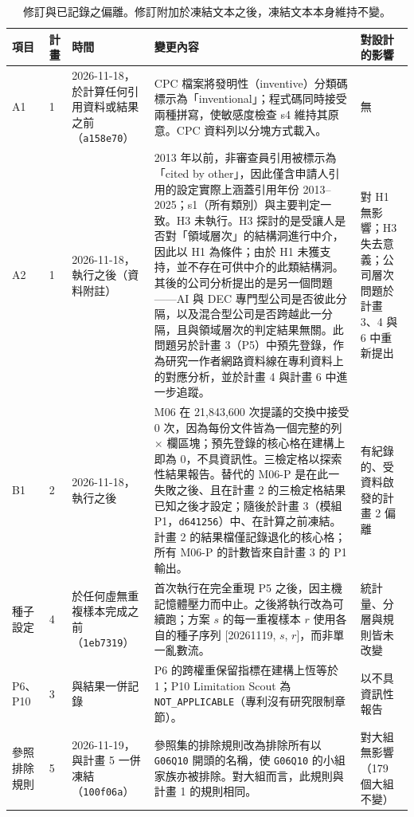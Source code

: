 \begin{table}[tbp]
\centering
\caption{修訂與已記錄之偏離。修訂附加於凍結文本之後，凍結文本本身維持不變。}
\label{zh:tab:app_amend}
\footnotesize
\setlength{\tabcolsep}{4pt}
\begin{tabular}{p{1.3cm}p{1.2cm}p{2.6cm}p{6.4cm}p{3.1cm}}
\toprule
項目 & 計畫 & 時間 & 變更內容 & 對設計的影響 \tabularnewline
\midrule
\raggedright A1 & \raggedright 1 & \raggedright 2026-11-18，於計算任何引用資料或結果之前（\texttt{a158e70}） & \raggedright CPC 檔案將發明性（inventive）分類碼標示為「inventional」；程式碼同時接受兩種拼寫，使敏感度檢查 s4 維持其原意。CPC 資料列以分塊方式載入。 & \raggedright 無 \tabularnewline
\addlinespace
\raggedright A2 & \raggedright 1 & \raggedright 2026-11-18，執行之後（資料附註） & \raggedright 2013 年以前，非審查員引用被標示為「cited by other」，因此僅含申請人引用的設定實際上涵蓋引用年份 2013--2025；s1（所有類別）與主要判定一致。H3 未執行。H3 探討的是受讓人是否對「領域層次」的結構洞進行中介，因此以 H1 為條件；由於 H1 未獲支持，並不存在可供中介的此類結構洞。其後的公司分析提出的是另一個問題——AI 與 DEC 專門型公司是否彼此分隔，以及混合型公司是否跨越此一分隔，且與領域層次的判定結果無關。此問題另於計畫 3（P5）中預先登錄，作為研究一作者網路資料線在專利資料上的對應分析，並於計畫 4 與計畫 6 中進一步追蹤。 & \raggedright 對 H1 無影響；H3 失去意義；公司層次問題於計畫 3、4 與 6 中重新提出 \tabularnewline
\addlinespace
\raggedright B1 & \raggedright 2 & \raggedright 2026-11-18，執行之後 & \raggedright M06 在 21,843,600 次提議的交換中接受 0 次，因為每份文件皆為一個完整的列 $\times$ 欄區塊；預先登錄的核心格在建構上即為 0，不具資訊性。三檢定格以探索性結果報告。替代的 M06-P 是在此一失敗之後、且在計畫 2 的三檢定格結果已知之後才設定；隨後於計畫 3（模組 P1，\texttt{d641256}）中、在計算之前凍結。計畫 2 的結果檔僅記錄退化的核心格；所有 M06-P 的計數皆來自計畫 3 的 P1 輸出。 & \raggedright 有紀錄的、受資料啟發的計畫 2 偏離 \tabularnewline
\addlinespace
\raggedright 種子設定 & \raggedright 4 & \raggedright 於任何虛無重複樣本完成之前（\texttt{1eb7319}） & \raggedright 首次執行在完全重現 P5 之後，因主機記憶體壓力而中止。之後將執行改為可續跑；方案 $s$ 的每一重複樣本 $r$ 使用各自的種子序列 [20261119, $s$, $r$]，而非單一亂數流。 & \raggedright 統計量、分層與規則皆未改變 \tabularnewline
\addlinespace
\raggedright P6、P10 & \raggedright 3 & \raggedright 與結果一併記錄 & \raggedright P6 的跨權重保留指標在建構上恆等於 1；P10 Limitation Scout 為 \texttt{NOT\_\allowbreak APPLICABLE}（專利沒有研究限制章節）。 & \raggedright 以不具資訊性報告 \tabularnewline
\addlinespace
\raggedright 參照排除規則 & \raggedright 5 & \raggedright 2026-11-19，與計畫 5 一併凍結（\texttt{100f06a}） & \raggedright 參照集的排除規則改為排除所有以 \texttt{G06Q10} 開頭的名稱，使 \texttt{G06Q10} 的小組家族亦被排除。對大組而言，此規則與計畫 1 的規則相同。 & \raggedright 對大組無影響（179 個大組不變） \tabularnewline

\end{tabular}
\end{table}
